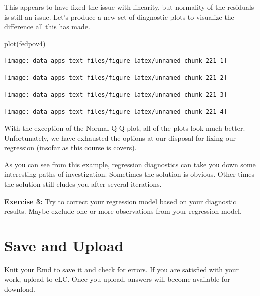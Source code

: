 \documentclass[
]{book}
\makeatletter
\newenvironment{Shaded}{\begin{snugshade}}{\end{snugshade}}
\newcommand{\FunctionTok}[1]{\textcolor[rgb]{0,0,0}{#1}}
\newcommand{\NormalTok}[1]{#1}
\newenvironment{kframe}{%
\medskip{}
\setlength{\fboxsep}{.8em}
 \def\at@end@of@kframe{}%
 \ifinner\ifhmode%
  \def\at@end@of@kframe{\end{minipage}}%
  \begin{minipage}{\columnwidth}%
 \fi\fi%
 \def\FrameCommand##1{\hskip\@totalleftmargin \hskip-\fboxsep
 \colorbox{shadecolor}{##1}\hskip-\fboxsep
     \hskip-\linewidth \hskip-\@totalleftmargin \hskip\columnwidth}%
 \MakeFramed {\advance\hsize-\width
   \@totalleftmargin\z@ \linewidth\hsize
   \@setminipage}}%
 {\par\unskip\endMakeFramed%
 \at@end@of@kframe}
\renewenvironment{Shaded}{\begin{kframe}}{\end{kframe}}
\newenvironment{rmdblock}[1]
  {\begin{shaded*}
  }
  {\end{shaded*}
  }
\newenvironment{learncheck}
  {\begin{rmdblock}{warning}}
  {\end{rmdblock}}
\makeatother
\begin{document}
This appears to have fixed the issue with linearity, but normality of the residuals is still an issue. Let's produce a new set of diagnostic plots to visualize the difference all this has made.

\begin{Shaded}
\begin{Highlighting}[]
\FunctionTok{plot}\NormalTok{(fedpov4)}
\end{Highlighting}
\end{Shaded}

\begin{center}\texttt{[image: data-apps-text\_files/figure-latex/unnamed-chunk-221-1]} \end{center}

\begin{center}\texttt{[image: data-apps-text\_files/figure-latex/unnamed-chunk-221-2]} \end{center}

\begin{center}\texttt{[image: data-apps-text\_files/figure-latex/unnamed-chunk-221-3]} \end{center}

\begin{center}\texttt{[image: data-apps-text\_files/figure-latex/unnamed-chunk-221-4]} \end{center}

With the exception of the Normal Q-Q plot, all of the plots look much better. Unfortunately, we have exhausted the options at our disposal for fixing our regression (insofar as this course is covers).

As you can see from this example, regression diagnostics can take you down some interesting paths of investigation. Sometimes the solution is obvious. Other times the solution still eludes you after several iterations.

\begin{learncheck}
\textbf{Exercise 3:} Try to correct your regression model based on your
diagnostic results. Maybe exclude one or more observations from your
regression model.
\end{learncheck}

\hypertarget{save-and-upload}{%
\section{Save and Upload}\label{save-and-upload}}

Knit your Rmd to save it and check for errors. If you are satisfied with your work, upload to eLC. Once you upload, answers will become available for download.
\end{document}
